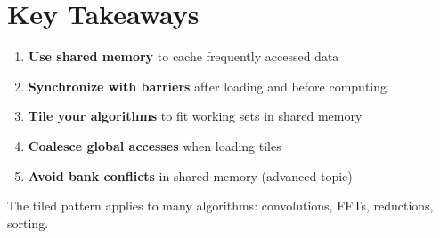 \section{Key Takeaways}

\begin{enumerate}[noitemsep]
  \item \textbf{Use shared memory} to cache frequently accessed data
  \item \textbf{Synchronize with barriers} after loading and before computing
  \item \textbf{Tile your algorithms} to fit working sets in shared memory
  \item \textbf{Coalesce global accesses} when loading tiles
  \item \textbf{Avoid bank conflicts} in shared memory (advanced topic)
\end{enumerate}

The tiled pattern applies to many  algorithms: convolutions, FFTs, reductions, sorting.


